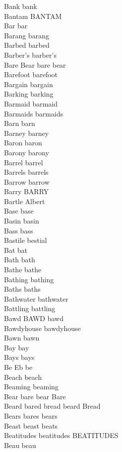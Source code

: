 Bank bank\\
Bantam BANTAM\\
Bar bar\\
Barang barang\\
Barbed barbed\\
Barber's barber's\\
Bare Bear bare bear\\
Barefoot barefoot\\
Bargain bargain\\
Barking barking\\
Barmaid barmaid\\
Barmaids barmaids\\
Barn barn\\
Barney barney\\
Baron baron\\
Barony barony\\
Barrel barrel\\
Barrels barrels\\
Barrow barrow\\
Barry BARRY\\
Bartle Albert\\
Base base\\
Basin basin\\
Bass bass\\
Bastile bestial\\
Bat bat\\
Bath bath\\
Bathe bathe\\
Bathing bathing\\
Baths baths\\
Bathwater bathwater\\
Battling battling\\
Bawd BAWD bawd\\
Bawdyhouse bawdyhouse\\
Bawn bawn\\
Bay bay\\
Bays bays\\
Be Eb be\\
Beach beach\\
Beaming beaming\\
Bear bare bear Bare\\
Beard bared bread beard Bread\\
Bears bares bears\\
Beast beast beats\\
Beatitudes beatitudes BEATITUDES\\
Beau beau\\
